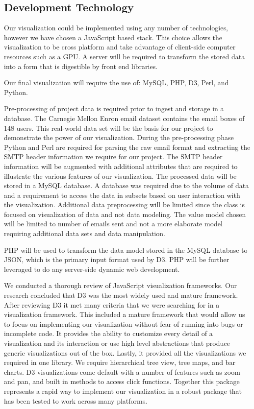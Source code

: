 \documentclass[12pt,letterpaper]{article}
\begin{document}
\subsection{Development Technology}
Our visualization could be implemented using any number of technologies, however we have chosen a JavaScript based stack.  This choice allows the visualization to be cross platform and take advantage of client-side computer resources such as a GPU.  A server will be required to transform the stored data into a form that is digestible by front end libraries.

Our final visualization will require the use of: MySQL, PHP, D3, Perl, and Python.

Pre-processing of project data is required prior to ingest and storage in a database.  The Carnegie Mellon Enron email dataset\cite{cmuenron} contains the email boxes of 148 users.  This real-world data set will be the basis for our project to demonstrate the power of our visualization.  During the pre-processing phase Python and Perl are required for parsing the raw email format and extracting the SMTP header information we require for our project.  The SMTP header information will be augmented with additional attributes that are required to illustrate the various features of our visualization.  The processed data will be stored in a MySQL database.  A database was required due to the volume of data and a requirement to access the data in subsets based on user interaction with the visualization.  Additional data preprocessing will be limited since the class is focused on visualization of data and not data modeling.  The value model chosen will be limited to number of emails sent and not a more elaborate model requiring additional data sets and data manipulation.   

PHP will be used to transform the data model stored in the MySQL database to JSON, which is the primary input format used by D3.  PHP will be further leveraged to do any server-side dynamic web development.

We conducted a thorough review of JavaScript visualization frameworks.  Our research concluded that D3 was the most widely used and mature framework.  After reviewing D3 it met many criteria that we were searching for in a visualization framework.  This included a mature framework that would allow us to focus on implementing our visualization without fear of running into bugs or incomplete code.  It provides the ability to customize every detail of a visualization and its interaction or use high level abstractions that produce generic visualizations out of the box.  Lastly, it provided all the visualizations we required in one library.  We require hierarchical tree view, tree maps, and bar charts.  D3 visualizations come default with a number of features such as zoom and pan, and built in methods to access click functions.  Together this package represents a rapid way to implement our visualization in a robust package that has been tested to work across many platforms.
\end{document}
